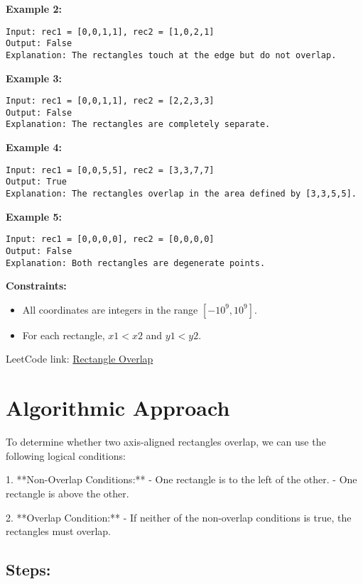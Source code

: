 \textbf{Example 2:}

\begin{verbatim}
Input: rec1 = [0,0,1,1], rec2 = [1,0,2,1]
Output: False
Explanation: The rectangles touch at the edge but do not overlap.
\end{verbatim}

\textbf{Example 3:}

\begin{verbatim}
Input: rec1 = [0,0,1,1], rec2 = [2,2,3,3]
Output: False
Explanation: The rectangles are completely separate.
\end{verbatim}

\textbf{Example 4:}

\begin{verbatim}
Input: rec1 = [0,0,5,5], rec2 = [3,3,7,7]
Output: True
Explanation: The rectangles overlap in the area defined by [3,3,5,5].
\end{verbatim}

\textbf{Example 5:}

\begin{verbatim}
Input: rec1 = [0,0,0,0], rec2 = [0,0,0,0]
Output: False
Explanation: Both rectangles are degenerate points.
\end{verbatim}

\textbf{Constraints:}

\begin{itemize}
    \item All coordinates are integers in the range \([-10^9, 10^9]\).
    \item For each rectangle, \(x1 < x2\) and \(y1 < y2\).
\end{itemize}

LeetCode link: \href{https://leetcode.com/problems/rectangle-overlap/}{Rectangle Overlap}

\section*{Algorithmic Approach}

To determine whether two axis-aligned rectangles overlap, we can use the following logical conditions:

1. **Non-Overlap Conditions:**
   - One rectangle is to the left of the other.
   - One rectangle is above the other.

2. **Overlap Condition:**
   - If neither of the non-overlap conditions is true, the rectangles must overlap.

\subsection*{Steps:}

